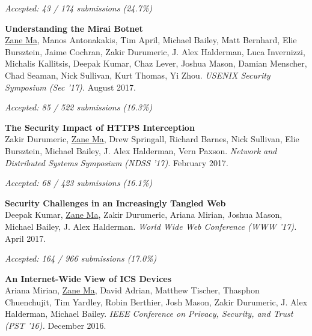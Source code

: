 \documentclass[10pt,singlecolumn]{article} %
\begin{document}
{\raggedleft\textit{Accepted: 43 / 174 submissions (24.7\%)}\par}
\vspace{6pt}


\textbf{Understanding the Mirai Botnet}\\
\underline{Zane Ma}, Manos Antonakakis, Tim April, Michael Bailey, Matt Bernhard, Elie Bursztein, Jaime Cochran, Zakir Durumeric, J. Alex Halderman, Luca Invernizzi, Michalis Kallitsis, Deepak Kumar, Chaz Lever, Joshua Mason, Damian Menscher, Chad Seaman, Nick Sullivan, Kurt Thomas, Yi Zhou.
\textit{USENIX Security Symposium (Sec '17).} August 2017.

{\raggedleft\textit{Accepted: 85 / 522 submissions (16.3\%)}\par}
\vspace{6pt}


\textbf{The Security Impact of HTTPS Interception}\\
Zakir Durumeric, \underline{Zane Ma}, Drew Springall, Richard Barnes, Nick Sullivan, Elie Bursztein, Michael
Bailey, J. Alex Halderman, Vern Paxson.
\textit{Network and Distributed Systems Symposium (NDSS '17).} February 2017.

{\raggedleft\textit{Accepted: 68 / 423 submissions (16.1\%)}\par}
\vspace{6pt}


\textbf{Security Challenges in an Increasingly Tangled Web}\\
Deepak Kumar, \underline{Zane Ma}, Zakir Durumeric, Ariana Mirian, Joshua Mason, Michael Bailey, J. Alex Halderman.
\textit{World Wide Web Conference (WWW '17).} April 2017.

{\raggedleft\textit{Accepted: 164 / 966 submissions (17.0\%)}\par}
\vspace{6pt}


\textbf{An Internet-Wide View of ICS Devices}\\
Ariana Mirian, \underline{Zane Ma}, David Adrian, Matthew Tischer, Thasphon Chuenchujit, Tim Yardley, Robin Berthier, Josh Mason, Zakir Durumeric, J. Alex Halderman, Michael Bailey.
\textit{IEEE Conference on Privacy, Security, and Trust (PST '16).} December 2016. 
\end{document}
